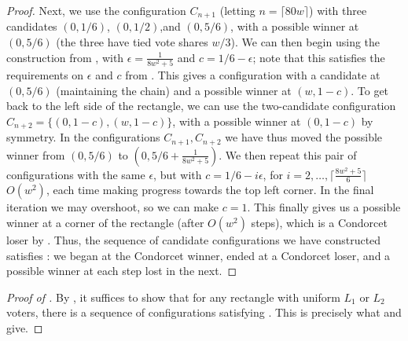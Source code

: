 \documentclass{article}
\theoremstyle{theorem}
\theoremstyle{definition}
\begin{document}
\begin{proof}
Next, we use the configuration $C_{n+1}$ (letting $n = \lceil80w \rceil$) with three candidates $(0, 1/6)$, $(0, 1/2)$,and $(0, 5/6)$, with a possible winner at $(0, 5/6)$ (the three have tied vote shares $w/3$). We can then begin using the construction from , with $\epsilon = \frac{1}{8w^2 + 5}$ and $c = 1/6 - \epsilon$; note that this satisfies the requirements on $\epsilon$ and $c$ from . This gives a configuration with a candidate at $(0, 5/6)$ (maintaining the chain) and a possible winner at $(w, 1-c)$. To get back to the left side of the rectangle, we can use the two-candidate configuration $C_{n+2} =  \{(0, 1-c), (w, 1-c)\}$, with a possible winner at $(0, 1-c)$ by symmetry. In the configurations $C_{n+1}, C_{n+2}$ we have thus moved the possible winner from $(0, 5/6)$ to $(0, 5/6 + \frac{1}{8w^2 + 5})$. We then repeat this pair of configurations with the same $\epsilon$, but with $c = 1/6 - i \epsilon$, for $i = 2, \dots, \lceil \frac{8w^2 + 5}{6} \rceil$   $O(w^2)$, each time making progress towards the top left corner. In the final iteration we may overshoot, so we can make $c = 1$. This finally gives us a possible winner at a corner of the rectangle (after $O(w^2)$ steps), which is a Condorcet loser by . Thus, the sequence of candidate configurations we have constructed satisfies : we began at the Condorcet winner, ended at a Condorcet loser, and a possible winner at each step lost in the next.

\end{proof}

\begin{proof}[Proof of ]
By , it suffices to show that for any rectangle with uniform $L_1$ or $L_2$ voters, there is a sequence of configurations satisfying . This is precisely what  and  give.
\end{proof}


\end{document}
